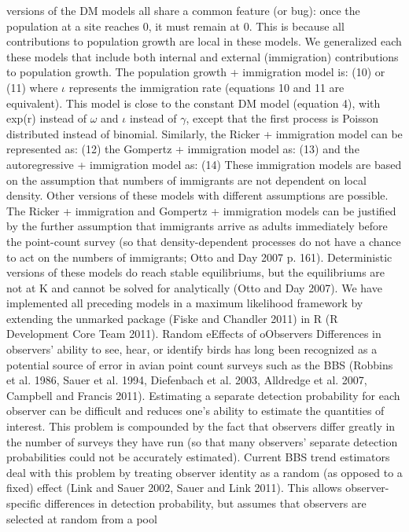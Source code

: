 \documentclass{article}
\begin{document}
versions of the DM models all share a common feature (or bug):
once the population at a site reaches 0, it must remain at 0.
This is because all contributions to population growth are
local in these models.  We generalized each these models that
include both internal and external (immigration) contributions
to population growth.  The population growth + immigration
model is:
(10)
or
(11)
where $\iota$ represents the immigration rate (equations 10 and 11 are
equivalent).  This model is close to the constant DM model (equation
4), with exp(r) instead of $\omega$ and $\iota$ instead of $\gamma$, except that the first
process is Poisson distributed instead of binomial.  Similarly, the
Ricker + immigration model can be represented as:
(12)
the Gompertz + immigration model as:
(13)
and the autoregressive + immigration model as:
(14)
These immigration models are based on the assumption that numbers
of immigrants are not dependent on local density.  Other versions
of these models with different assumptions are possible. The
Ricker + immigration and Gompertz + immigration models can be
justified by the further assumption that immigrants arrive as
adults immediately before the point-count survey (so that
density-dependent processes do not have a chance to act on the
numbers of immigrants; Otto and Day 2007 p. 161).  Deterministic
versions of these models do reach stable equilibriums, but the
equilibriums are not at K and cannot be solved for analytically
(Otto and Day 2007).  We have implemented all preceding models in
a maximum likelihood framework by extending the unmarked package
(Fiske and Chandler 2011) in R (R Development Core Team 2011).
Random eEffects of oObservers
Differences in observers' ability to see, hear, or identify
birds has long been recognized as a potential source of error
in avian point count surveys such as the BBS (Robbins et
al. 1986, Sauer et al. 1994, Diefenbach et al. 2003, Alldredge
et al. 2007, Campbell and Francis 2011).  Estimating a
separate detection probability for each observer can be
difficult and reduces one's ability to estimate the quantities
of interest.  This problem is compounded by the fact that
observers differ greatly in the number of surveys they have
run (so that many observers' separate detection probabilities
could not be accurately estimated).
Current BBS trend estimators deal with this problem by
treating observer identity as a random (as opposed to a fixed)
effect (Link and Sauer 2002, Sauer and Link 2011).  This
allows observer-specific differences in detection probability,
but assumes that observers are selected at random from a pool
\end{document}
